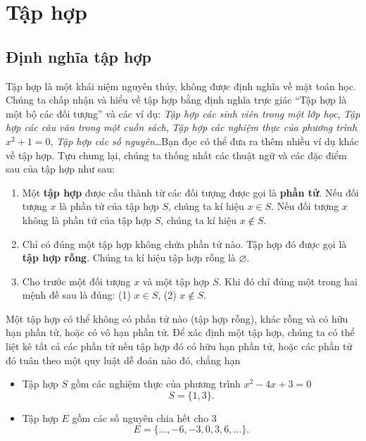 \section{Tập hợp}

\subsection{Định nghĩa tập hợp}

Tập hợp là một khái niệm nguyên thủy, không được định nghĩa về mặt toán học. Chúng ta chấp nhận và hiểu về tập hợp bằng định nghĩa trực giác ``Tập hợp là một bộ các đối tượng'' và các ví dụ: \textit{Tập hợp các sinh viên trong một lớp học}, \textit{Tập hợp các câu văn trong một cuốn sách}, \textit{Tập hợp các nghiệm thực của phương trình $x^{2} + 1 = 0$}, \textit{Tập hợp các số nguyên}\ldots Bạn đọc có thể đưa ra thêm nhiều ví dụ khác về tập hợp. Tựu chung lại, chúng ta thống nhất các thuật ngữ và các đặc điểm sau của tập hợp như sau:
\begin{enumerate}[label={(\arabic*)},itemsep=0pt]
    \item Một \textbf{tập hợp} được cấu thành từ các đối tượng được gọi là \textbf{phần tử}. Nếu đối tượng $x$ là phần tử của tập hợp $S$, chúng ta kí hiệu $x\in S$. Nếu đối tượng $x$ không là phần tử của tập hợp $S$, chúng ta kí hiệu $x\notin S$.
    \item Chỉ có đúng một tập hợp không chứa phần tử nào. Tập hợp đó được gọi là \textbf{tập hợp rỗng}. Chúng ta kí hiệu tập hợp rỗng là $\varnothing$.
    \item Cho trước một đối tượng $x$ và một tập hợp $S$. Khi đó chỉ đúng một trong hai mệnh đề sau là đúng: (1) $x\in S$, (2) $x\notin S$.
\end{enumerate}

Một tập hợp có thể không có phần tử nào (tập hợp rỗng), khác rỗng và có hữu hạn phần tử, hoặc có vô hạn phần tử. Để xác định một tập hợp, chúng ta có thể liệt kê tất cả các phần tử nếu tập hợp đó có hữu hạn phần tử, hoặc các phần tử đó tuân theo một quy luật dễ đoán nào đó, chẳng hạn
\begin{itemize}
    \item Tập hợp $S$ gồm các nghiệm thực của phương trình $x^{2} - 4x + 3 = 0$
          \[
              S = \{ 1, 3 \}.
          \]
    \item Tập hợp $E$ gồm các số nguyên chia hết cho $3$
          \[
              E = \{ \ldots, -6, -3, 0, 3, 6, \ldots \}.
          \]
\end{itemize}

